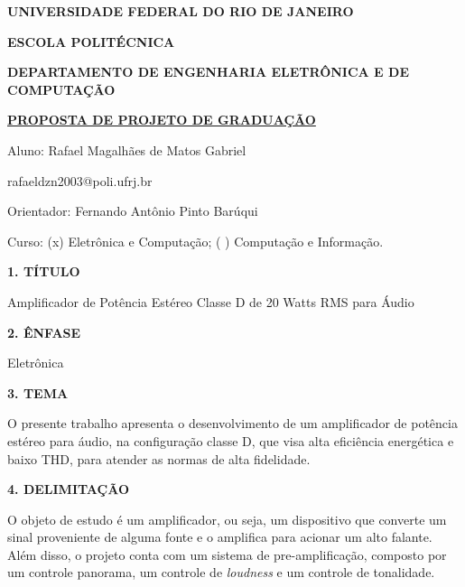 \documentclass{article}
\begin{document}
\begin{center}
    
\textbf{UNIVERSIDADE FEDERAL DO RIO DE JANEIRO}
\vspace{-0.2cm}

\textbf{ESCOLA POLITÉCNICA}
\vspace{-0.2cm}

\textbf{DEPARTAMENTO DE ENGENHARIA ELETRÔNICA E DE COMPUTAÇÃO}
\vspace{0.8cm}

\underline{\textbf{PROPOSTA DE PROJETO DE GRADUAÇÃO}}

Aluno: Rafael Magalhães de Matos Gabriel
\vspace{-0.2cm}

rafaeldzn2003@poli.ufrj.br

Orientador: Fernando Antônio Pinto Barúqui

\vspace{0.2cm}

Curso: (x) Eletrônica e Computação;  ( ) Computação e Informação.

\end{center}

\textbf{1. TÍTULO}

    Amplificador de Potência Estéreo Classe D de 20 Watts RMS para Áudio

\vspace{0.4cm}

\textbf{2. ÊNFASE}

    Eletrônica

\vspace{0.4cm}

\textbf{3. TEMA}

O presente trabalho apresenta o desenvolvimento de um amplificador de potência estéreo para áudio, na configuração classe D,
que visa alta eficiência energética e baixo THD, para atender as normas de alta fidelidade.


\vspace{0.4cm}

\textbf{4. DELIMITAÇÃO}

O objeto de estudo é um amplificador, ou seja, um dispositivo que converte um sinal proveniente de alguma fonte 
e o amplifica para acionar um alto falante. %
Além disso, o projeto conta com um sistema de pre-amplificação, composto por um controle panorama, %
um controle de \textit{loudness} e um controle de tonalidade. %
\end{document}
